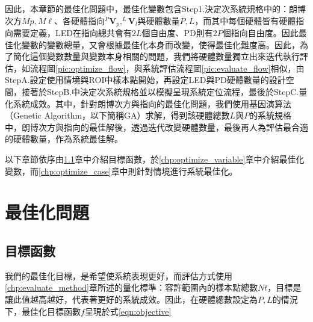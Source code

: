 因此，本章節的最佳化問題中，最佳化變數包含Step1.決定次系統規格中的：朗博次方$Mp,M\ell$、各硬體指向$^{P}\boldsymbol{V}_p,^{L}\boldsymbol{V}_l$與硬體數量$P,L$，而其中每個硬體皆有硬體指向需要定義，LED在指向總共會有$2L$個自由度、PD則有$2P$個指向自由度。因此最佳化變數的變數總量，又會根據最佳化本身而改變，使得最佳化難度高。因此，為了簡化這個變數數量與變數本身相關的問題，我們將硬體數量獨立出來迭代執行評估，如流程圖\ref{pic:optimize_flow}，與系統評估流程圖\ref{pic:evaluate_flow}相似，由StepA.設定使用情境與ROI中樣本點開始，再設定LED與PD硬體數量的設計空間，接著於StepB.中決定次系統規格並以模擬呈現系統定位流程，最後於StepC.量化系統成效。其中，針對朗博次方與指向的最佳化問題，我們使用基因演算法（Genetic Algorithm，以下簡稱GA）求解，得到該硬體總數$L$與$P$的系統規格中，朗博次方與指向的最佳解後，透過迭代改變硬體數量，最後再人為評估最合適的硬體數量，作為系統最佳解。






以下章節依序由\ref{chp:objective}章中介紹目標函數，於\ref{chp:optimize_variable}章中介紹最佳化變數，而\ref{chp:optimize_case}章中則針對情境進行系統最佳化。

\section{最佳化問題}
\label{chp:optimize}
    \subsection{目標函數}
    \label{chp:objective}

    我們的最佳化目標，是希望使系統表現更好，而評估方式使用\ref{chp:evaluate_method}章所述的量化標準：容許範圍內的樣本點總數$Nt$，目標是讓此值越高越好，代表著更好的系統成效。因此，在硬體總數設定為$P,L$的情況下，最佳化目標函數$f$呈現於式\ref{eqn:objective}

